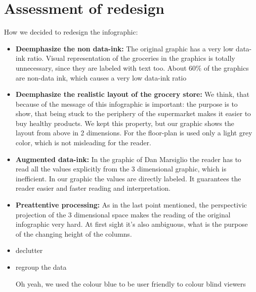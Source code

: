 \section{Assessment of redesign}

How we decided to redesign the infographic:

\begin{itemize}
	\item \textbf{Deemphasize the non data-ink:} The original graphic has a very low data-ink ratio. Visual representation of the groceries in the graphics is totally unnecessary, since they are labeled with text too. About 60\% of the graphics are non-data ink, which causes a very low data-ink ratio 
    \item \textbf{Deemphasize the realistic layout of the grocery store:} We think, that because of the message of this infographic is important: the purpose is to show, that being stuck to the periphery of the supermarket makes it easier to buy healthy products. We kept this property, but our graphic shows the layout from above in 2 dimensions. For the floor-plan is used only a light grey color, which is not misleading for the reader.
	\item \textbf{Augmented data-ink:} In the graphic of Dan Marsiglio the reader has to read all the values explicitly from the 3 dimensional graphic, which is inefficient. In our graphic the values are directly labeled. It guarantees the reader easier and faster reading and interpretation.
    \item \textbf{Preattentive processing:} As in the last point mentioned, the perspectivic projection of the 3 dimensional space makes the reading of the original infographic very hard. At first sight it's also ambiguous, what is the purpose of the changing height of the columns.  
	\item declutter
	\item regroup the data
	
	
	Oh yeah, we used the colour blue to be user friendly to colour blind viewers
\end{itemize}





